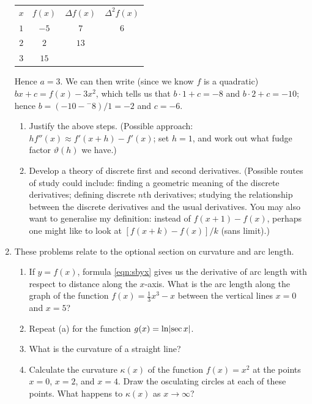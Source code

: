 \begin{enumerate}
        \begin{tabular}{c|c|c|c}
          $ x $ & $ f(x) $ & $ \Delta f(x) $ & $ \Delta^2 f(x) $\\
          $ 1 $ & $ -5 $ & $ 7 $ & $ 6 $\\
          $ 2 $ & $ 2 $ & $ 13 $ & \\
          $ 3 $ & $ 15 $ &&
        \end{tabular}

        Hence $ a = 3 $. We can then write (since we know $ f $ is a quadratic) $ bx + c = f(x) - 3x^2 $, which tells us that $ b\cdot 1 + c = -8 $
        and $ b \cdot 2 + c = -10 $; hence $ b = (-10 - {}^{-}8)/1 = -2 $ and $ c = -6 $. \label{exercise:funtimeswithcalculus}

        \begin{enumerate}
          \item Justify the above steps. (Possible approach: $ hf''(x) \approx f'(x + h) - f'(x) $; set $ h = 1 $, and work out what fudge
                factor $ \vartheta(h) $ we have.)
          \item Develop a theory of discrete first and second derivatives. (Possible routes of study could include: finding a geometric
                meaning of the discrete derivatives; defining discrete $ n$th derivatives; studying the relationship between the discrete
                derivatives and the usual derivatives. You may also want to generalise my definition: instead of $ f(x + 1) - f(x) $,
                perhaps one might like to look at $ [f(x + k) - f(x)]/k $ (sans limit).)
        \end{enumerate}
  \item These problems relate to the optional section on curvature and arc length.
    \begin{enumerate}
      \item If $ y = f(x) $, formula \ref{eqn:sbyx} gives us the derivative of arc length with respect to distance
            along the $ x$-axis. What is the arc length along the graph of the function $ f(x) = \frac{1}{3}x^3 - x $
            between the vertical lines $ x = 0 $ and $ x = 5 $?
      \item Repeat (a) for the function $ g(x) = \ln \abs{\sec x} $.
      \item What is the curvature of a straight line?
      \item Calculate the curvature $ \kappa(x) $ of the function $ f(x) = x^2 $ at the points $ x = 0 $, $ x = 2 $, and $ x = 4 $.
            Draw the osculating circles at each of these points. What happens to $ \kappa(x) $ as $ x \to \infty $?

\end{enumerate}
\end{enumerate}
